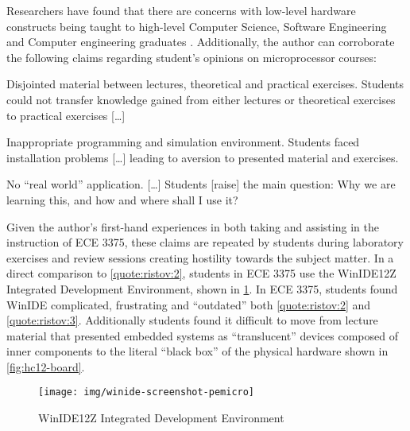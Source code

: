 Researchers have found that there are concerns with low-level hardware constructs being taught to high-level Computer Science, Software Engineering and Computer engineering graduates \cite{Ristov2011, Stolikj2011}. Additionally, the author can corroborate the following claims regarding student's opinions on microprocessor courses: 
\begin{displayquote}
    \begin{observations}
        \item Disjointed material between lectures, theoretical and practical
        exercises. Students could not transfer knowledge gained from either lectures or theoretical exercises to practical exercises [\dots] 
            \label{quote:ristov:1}
        \item Inappropriate programming and simulation environment. Students faced installation problems [\dots] leading to aversion to presented material and exercises.
            \label{quote:ristov:2}
        \item No ``real world'' application. [\dots] Students [raise] the main question: Why we are learning this, and how and where shall I use it?
            \label{quote:ristov:3}
    \end{observations}
\end{displayquote}
Given the author's first-hand experiences in both taking and assisting in the instruction of ECE 3375, these claims are repeated by students during laboratory exercises and review sessions creating hostility towards the subject matter. In a direct comparison to \cref{quote:ristov:2}, students in ECE 3375 use the WinIDE12Z Integrated Development Environment\cite{winide}, shown in \cref{fig:winide-screenshot-pemicro}. In ECE 3375, students found WinIDE complicated, frustrating and ``outdated'' \cite{evals:ece3375-2013, evals:ece3375-2014} both \cref{quote:ristov:2} and \cref{quote:ristov:3}. Additionally students found it difficult to move from lecture material that presented embedded systems as ``translucent'' devices composed of inner components to the literal ``black box'' of the physical hardware shown in \cref{fig:hc12-board}. 

\begin{figure}[!ht]
    \centering
    \texttt{[image: img/winide-screenshot-pemicro]}
    \caption{WinIDE12Z Integrated Development Environment\cite{winide-screenshot}}
    \label{fig:winide-screenshot-pemicro}
\end{figure}

